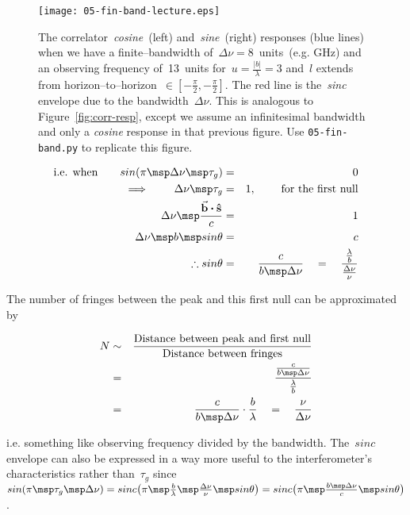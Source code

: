 \begin{figure}
  \centering
  \texttt{[image: 05-fin-band-lecture.eps]}
  \caption[]{The correlator~\emph{cosine}~(left) and~\emph{sine}~(right) responses (blue lines) when we have a finite--bandwidth of~$\Delta \nu = 8$~units~(e.g. GHz) and an observing frequency of~13~units for~$u = \frac{|b|}{\lambda} = 3$ and~$l$ extends from horizon--to--horizon~$\in [-\frac{\pi}{2},-\frac{\pi}{2}]$. The red line is the~\emph{sinc} envelope due to the bandwidth~$\Delta \nu $. This is analogous to Figure~\ref{fig:corr-resp}, except we assume an infinitesimal bandwidth and only a \emph{cosine} response in that previous figure. Use \texttt{05-fin-band.py} to replicate this figure.}
  \label{fig:05-fin-band}
\end{figure}

\begin{eqnarray}
  \label{eq:30}
  \mbox{i.e. when} \qquad sin (\pi \msp \Delta \nu \msp \tau _g) &=& 0 \nonumber \\
  \implies \qquad                       \Delta \nu \msp \tau _g  &=& 1 , \hspace{0.8cm} \mbox{for the first null}\nonumber \\
  \Delta \nu \msp  \frac{\vec{\mathbf{b}} \boldsymbol{\cdot} \mathbf{\hat{s}}}{c} &=& 1 \nonumber \\
  \Delta \nu \msp b \msp sin\theta &=& c \nonumber \\
  \therefore sin\theta &=& \frac{c}{b\msp \Delta \nu } \quad = \quad \frac{\frac{\lambda}{b}}{\frac{\Delta \nu }{\nu }} \nonumber
\end{eqnarray}

The number of fringes between the peak and this first null can be approximated by

\begin{eqnarray}
  \label{eq:31}
  N &\sim & \frac{\mbox{Distance between peak and first null}}{\mbox{Distance between fringes}} \nonumber \\
    &=&\frac{\frac{c}{b\msp \Delta \nu}}{\frac{\lambda }{b}} \nonumber \\
    &=& \frac{c}{b\msp \Delta \nu} \cdot \frac{b}{\lambda } \quad = \quad \frac{\nu }{\Delta \nu } \nonumber
\end{eqnarray}

i.e. something like observing frequency divided by the bandwidth. The~$sinc$ envelope can also be expressed in a way more useful to the interferometer's characteristics rather than~$\tau _g$ since~$sin(\pi \msp \tau _g \msp \Delta \nu ) = sinc \big (\pi \msp \frac{b}{\lambda } \msp \frac{\Delta \nu }{\nu } \msp sin\theta \big ) = sinc \big (\pi \msp \frac{b \msp \Delta \nu }{c} \msp sin\theta \big )$.

